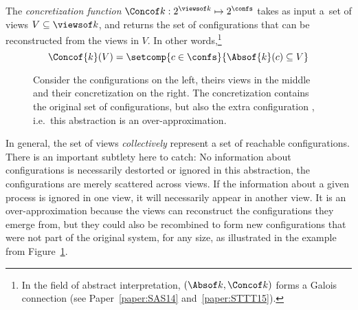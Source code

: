 %
The \emph{concretization function} %
$\Concof k : 2^{\viewsof k}\mapsto 2^\confs$ takes as input a~set of
views $V\subseteq\viewsof k$, and returns the set of configurations
that can be reconstructed from the views in $V$.
%
In other words,\footnote{In the field of 
  abstract interpretation, $(\Absof k, \Concof k)$ forms a
  Galois connection (see Paper~\ref{paper:SAS14} and~\ref{paper:STTT15}).%
}
$$\Concof{k}(V) =
\setcomp{c\in\confs}{\Absof{k}(c)\subseteq V}$$

\begingroup%
\setlength\intextsep{\dazintextsep}
\begin{figure}[ht]
  \centering
  \caption{Consider the configurations on the left, theirs views in
    the middle and their concretization on the right. %
    The concretization contains the original set of configurations,
    but also the extra configuration \protect{}, %
    i.e.\ this abstraction is an over-approximation.}
  \label{figure:view:abstraction:example}
\end{figure}
\endgroup

%
In general, the set of views \emph{collectively} represent a set of
reachable configurations.
%
There is an important subtlety here to catch: No information about
configurations is necessarily destorted or ignored in this
abstraction, the configurations are merely scattered across views. If
the information about a given process is ignored in one view, it will
necessarily appear in another view.
%
It is an over-approximation because the views can reconstruct the
configurations they emerge from, but they could also be recombined to
form new configurations that were not part of the original system, for
any size, as illustrated in the example from
Figure~\ref{figure:view:abstraction:example}.

